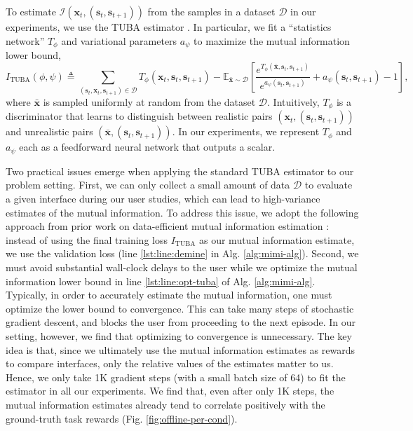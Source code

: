 \documentclass{article}
\newcommand{\bx}{\mathbf{x}}
\newcommand{\bs}{\mathbf{s}}
\newcommand{\mi}{\mathcal{I}}
\begin{document}
To estimate $\mi(\bx_t, (\bs_t, \bs_{t+1}))$ from the samples in a dataset $\mathcal{D}$ in our experiments, we use the TUBA estimator \cite{agakov2004algorithm,poole2018variational}.
In particular, we fit a ``statistics network'' $T_{\phi}$ and variational parameters $a_{\psi}$ to maximize the mutual information lower bound, 
\begin{equation} \label{eqn:tuba}
I_{\mathrm{TUBA}}(\phi, \psi) \triangleq \sum_{(\bs_t, \bx_t, \bs_{t+1}) \in \mathcal{D}} T_{\phi}(\bx_t, \bs_t, \bs_{t+1}) - \mathbb{E}_{\bar{\bx} \sim \mathcal{D}} \left[\frac{e^{T_{\phi}(\bar{\bx}, \bs_t, \bs_{t+1})}}{e^{a_{\psi}(\bs_t, \bs_{t+1})}} + a_{\psi}(\bs_t, \bs_{t+1}) - 1 \right],
\end{equation}
where $\bar{\bx}$ is sampled uniformly at random from the dataset $\mathcal{D}$.
Intuitively, $T_{\phi}$ is a discriminator that learns to distinguish between realistic pairs $(\bx_t, (\bs_t, \bs_{t+1}))$ and unrealistic pairs $(\bar{\bx}, (\bs_t, \bs_{t+1}))$.
In our experiments, we represent $T_{\phi}$ and $a_{\psi}$ each as a feedforward neural network that outputs a scalar.

Two practical issues emerge when applying the standard TUBA estimator to our problem setting.
First, we can only collect a small amount of data $\mathcal{D}$ to evaluate a given interface during our user studies, which can lead to high-variance estimates of the mutual information.
To address this issue, we adopt the following approach from prior work on data-efficient mutual information estimation \cite{lin2019data}: instead of using the final training loss $I_{\mathrm{TUBA}}$ as our mutual information estimate, we use the validation loss (line \ref{lst:line:demine} in Alg. \ref{alg:mimi-alg}).
Second, we must avoid substantial wall-clock delays to the user while we optimize the mutual information lower bound in line \ref{lst:line:opt-tuba} of Alg. \ref{alg:mimi-alg}.
Typically, in order to accurately estimate the mutual information, one must optimize the lower bound to convergence.
This can take many steps of stochastic gradient descent, and blocks the user from proceeding to the next episode.
In our setting, however, we find that optimizing to convergence is unnecessary.
The key idea is that, since we ultimately use the mutual information estimates as rewards to compare interfaces, only the relative values of the estimates matter to us.
Hence, we only take 1K gradient steps (with a small batch size of 64) to fit the estimator in all our experiments.
We find that, even after only 1K steps, the mutual information estimates already tend to correlate positively with the ground-truth task rewards (Fig. \ref{fig:offline-per-cond}).
\end{document}
